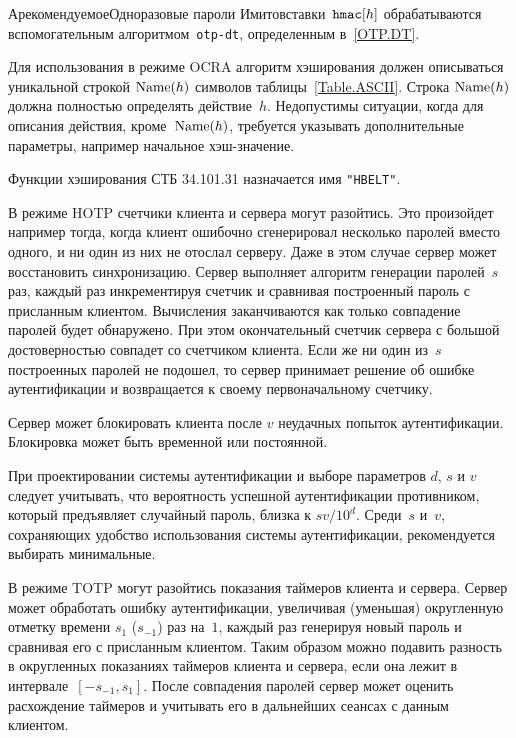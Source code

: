 \begin{appendix}{А}{рекомендуемое}{Одноразовые пароли}
Имитовставки~$\texttt{hmac}[h]$ обрабатываются вспомогательным 
алгоритмом~\texttt{otp-dt}, определенным в~\ref{OTP.DT}.

Для использования в режиме OCRA
алгоритм хэширования должен описываться уникальной строкой
$\text{Name}(h)$ символов таблицы~\ref{Table.ASCII}. 
%
Строка $\text{Name}(h)$ должна полностью определять действие~$h$.
Недопустимы ситуации, когда для описания действия, 
кроме~$\text{Name}(h)$, требуется указывать дополнительные параметры, 
например начальное хэш-значение.

Функции хэширования СТБ 34.101.31 назначается имя 
\texttt{"HBELT"}.



В режиме HOTP счетчики клиента и сервера могут разойтись.
Это произойдет например тогда, когда клиент ошибочно сгенерировал 
несколько паролей вместо одного, и ни один из них не отослал серверу. 
Даже в этом случае сервер может восстановить синхронизацию. 
Сервер выполняет алгоритм генерации паролей~$s$ раз, 
каждый раз инкрементируя счетчик и сравнивая построенный пароль 
с присланным клиентом. Вычисления заканчиваются как только 
совпадение паролей будет обнаружено. При этом окончательный счетчик 
сервера с большой достоверностью совпадет со счетчиком клиента.
%
Если же ни один из~$s$ построенных паролей не подошел, 
то сервер принимает решение об ошибке аутентификации
и возвращается к своему первоначальному счетчику.

Сервер может блокировать клиента после $v$ неудачных попыток аутентификации. 
Блокировка может быть временной или постоянной.

При проектировании системы аутентификации 
и выборе параметров $d$, $s$ и $v$ следует учитывать, 
что вероятность успешной аутентификации противником,
который предъявляет случайный пароль, близка к
${sv}/{10^d}$.
%
Среди~$s$ и~$v$, сохраняющих удобство использования системы аутентификации, 
рекомендуется выбирать минимальные.

В режиме TOTP могут разойтись показания таймеров клиента и сервера.
Сервер может обработать ошибку аутентификации, увеличивая (уменьшая) 
округленную отметку времени $s_{1}$ ($s_{-1}$) раз на~$1$,
каждый раз генерируя новый пароль и сравнивая его с присланным 
клиентом. Таким образом можно подавить разность в округленных показаниях
таймеров клиента и сервера, если она лежит в интервале~$[-s_{-1},s_1]$.
%
После совпадения паролей сервер может оценить расхождение
таймеров и учитывать его в дальнейших сеансах с данным клиентом.


\end{appendix}
